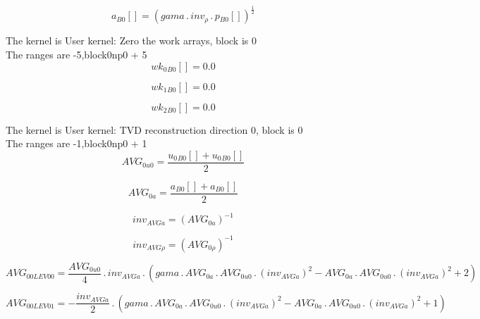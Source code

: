 \documentclass{article}
\begin{document}
\begin{dmath}{a{_{B0}}}[{}] = \left(gama \,.\, inv_{\rho} \,.\, {p{_{B0}}}[{}] \right)^{\frac{1}{2}}\end{dmath}

\noindent The kernel is User kernel: Zero the work arrays, block is 0\\\noindent The ranges are -5,block0np0 + 5\\\begin{dmath}{wk_{0}{_{B0}}}[{}] = 0.0\end{dmath}

\begin{dmath}{wk_{1}{_{B0}}}[{}] = 0.0\end{dmath}

\begin{dmath}{wk_{2}{_{B0}}}[{}] = 0.0\end{dmath}

\noindent The kernel is User kernel: TVD reconstruction direction 0, block is 0\\\noindent The ranges are -1,block0np0 + 1\\\begin{dmath}AVG_{0 u0} = \frac{{u_{0}{_{B0}}}[{}] + {u_{0}{_{B0}}}[{}]}{2}\end{dmath}

\begin{dmath}AVG_{0 a} = \frac{{a{_{B0}}}[{}] + {a{_{B0}}}[{}]}{2}\end{dmath}

\begin{dmath}inv_{AVG a} = \left(AVG_{0 a} \right)^{-1}\end{dmath}

\begin{dmath}inv_{AVG \rho} = \left(AVG_{0 \rho} \right)^{-1}\end{dmath}

\begin{dmath}AVG_{0 0 LEV 00} = \frac{AVG_{0 u0}}{4} \,.\, inv_{AVG a} \,.\, \left(gama \,.\, AVG_{0 a} \,.\, AVG_{0 u0} \,.\, \left(inv_{AVG a} \right)^{2} - AVG_{0 a} \,.\, AVG_{0 u0} \,.\, \left(inv_{AVG a} \right)^{2} + 2\right)\end{dmath}

\begin{dmath}AVG_{0 0 LEV 01} = - \frac{inv_{AVG a}}{2} \,.\, \left(gama \,.\, AVG_{0 a} \,.\, AVG_{0 u0} \,.\, \left(inv_{AVG a} \right)^{2} - AVG_{0 a} \,.\, AVG_{0 u0} \,.\, \left(inv_{AVG a} \right)^{2} + 1\right)\end{dmath}
\end{document}
